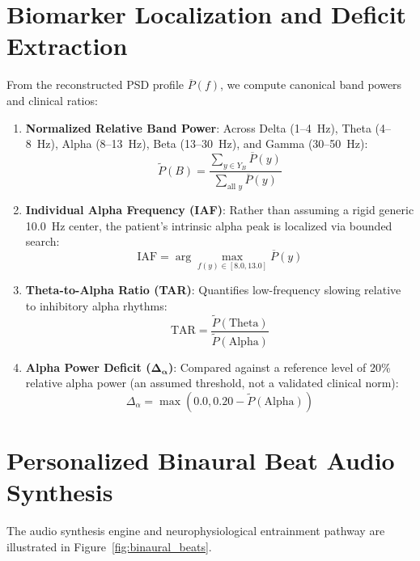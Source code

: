 \documentclass[12pt, a4paper]{report}
\begin{document}
\section{Biomarker Localization and Deficit Extraction}
\label{sec:biomarker_extraction}
From the reconstructed PSD profile $\overline{P}(f)$, we compute canonical band powers and clinical ratios:
\begin{enumerate}
    \item \textbf{Normalized Relative Band Power}: Across Delta (1--4~Hz), Theta (4--8~Hz), Alpha (8--13~Hz), Beta (13--30~Hz), and Gamma (30--50~Hz):
    \begin{equation}
        \tilde{P}(B) = \frac{\sum_{y \in Y_B} \overline{P}(y)}{\sum_{\text{all } y} \overline{P}(y)}
        \label{eq:norm_band_power}
    \end{equation}
    \item \textbf{Individual Alpha Frequency (IAF)}: Rather than assuming a rigid generic 10.0~Hz center, the patient's intrinsic alpha peak is localized via bounded search:
    \begin{equation}
        \text{IAF} = \arg\max_{f(y) \in [8.0, 13.0]} \overline{P}(y)
        \label{eq:iaf_argmax}
    \end{equation}
    \item \textbf{Theta-to-Alpha Ratio (TAR)}: Quantifies low-frequency slowing relative to inhibitory alpha rhythms:
    \begin{equation}
        \text{TAR} = \frac{\tilde{P}(\text{Theta})}{\tilde{P}(\text{Alpha})}
        \label{eq:tar_ratio}
    \end{equation}
    \item \textbf{Alpha Power Deficit ($\boldsymbol{\Delta_{\boldsymbol{\alpha}}}$)}: Compared against a reference level of 20\% relative alpha power (an assumed threshold, not a validated clinical norm):
    \begin{equation}
        \Delta_{\alpha} = \max\left(0.0, 0.20 - \tilde{P}(\text{Alpha})\right)
        \label{eq:alpha_deficit}
    \end{equation}
\end{enumerate}

\section{Personalized Binaural Beat Audio Synthesis}
\label{sec:audio_synthesis}
The audio synthesis engine and neurophysiological entrainment pathway are illustrated in Figure~\ref{fig:binaural_beats}.
\end{document}

